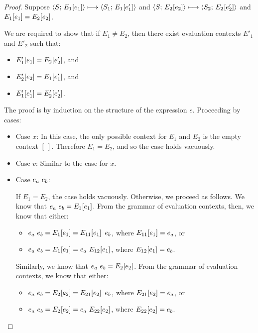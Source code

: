 \begin{proof}
  Suppose $\langle S;\, E_1\hspace{-0.5mm}\left[e_1\right] \rangle \longmapsto \langle S_1;\, E_1\hspace{-0.5mm}\left[e'_1\right] \rangle$ and
  $\langle S;\, E_2\hspace{-0.5mm}\left[e_2\right] \rangle \longmapsto
  \langle S_2;\, E_2\hspace{-0.5mm}\left[e'_2\right] \rangle$ and $E_1\hspace{-0.5mm}\left[e_1\right] =
  E_2\hspace{-0.5mm}\left[e_2\right]$.

  We are required to show that if $E_1 \neq E_2$, then there exist
  evaluation contexts $E'_1$ and $E'_2$ such that:
  \begin{itemize}
  \item $E'_1\hspace{-0.5mm}\left[e_1\right] = E_2\hspace{-0.5mm}\left[e'_2\right]$, and
  \item $E'_2\hspace{-0.5mm}\left[e_2\right] = E_1\hspace{-0.5mm}\left[e'_1\right]$, and
  \item $E'_1\hspace{-0.5mm}\left[e'_1\right] = E'_2\hspace{-0.5mm}\left[e'_2\right]$.
  \end{itemize}

  The proof is by induction on the structure of the expression $e$.
  Proceeding by cases:

  \begin{itemize}

    \item Case $x$: In this case, the only possible context for $E_1$
      and $E_2$ is the empty context $[~]$.  Therefore $E_1 = E_2$,
      and so the case holds vacuously.

    \item Case $v$: Similar to the case for $x$.

    \item Case $e_a~e_b$:

      If $E_1 = E_2$, the case holds vacuously.  Otherwise, we proceed
      as follows.  We know that $e_a~e_b =
      E_1\hspace{-0.5mm}\left[e_1\right]$.  From the grammar of evaluation contexts,
      then, we know that either:
      \begin{itemize}
        \item $e_a~e_b = E_1\hspace{-0.5mm}\left[e_1\right] = E_{11}\hspace{-0.5mm}\left[e_1\right]~e_b$, where $E_{11}\hspace{-0.5mm}\left[e_1\right] = e_a$, or
        \item $e_a~e_b = E_1\hspace{-0.5mm}\left[e_1\right] = e_a~E_{12}\hspace{-0.5mm}\left[e_1\right]$, where $E_{12}\hspace{-0.5mm}\left[e_1\right] = e_b$.
      \end{itemize}

      Similarly, we know that $e_a~e_b = E_2\hspace{-0.5mm}\left[e_2\right]$.  From the grammar of
      evaluation contexts, we know that either:
      \begin{itemize}
        \item $e_a~e_b = E_2\hspace{-0.5mm}\left[e_2\right] = E_{21}\hspace{-0.5mm}\left[e_2\right]~e_b$, where $E_{21}\hspace{-0.5mm}\left[e_2\right] = e_a$, or
        \item $e_a~e_b = E_2\hspace{-0.5mm}\left[e_2\right] = e_a~E_{22}\hspace{-0.5mm}\left[e_2\right]$, where $E_{22}\hspace{-0.5mm}\left[e_2\right] = e_b$.
      \end{itemize}


\end{itemize}
\end{proof}
